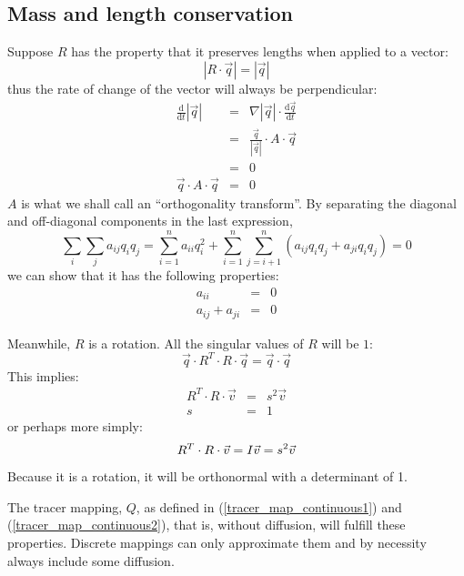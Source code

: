 \documentclass[11pt]{article}
\begin{document}
\subsection{Mass and length conservation}

Suppose $R$ has the property that it preserves lengths when applied to
a vector:
\begin{equation}
|R\cdot \vec q| = |\vec q|
\label{length_preservation}
\end{equation}
thus the rate of change of the vector will always be perpendicular:
\begin{eqnarray}
\frac{\mathrm d}{\mathrm d t}|\vec q| & = & 
	\nabla |\vec q| \cdot \frac{\mathrm d \vec q}{\mathrm d t} \\
	&=& \frac{\vec q}{|\vec q|} \cdot A \cdot \vec q \\
	&=& 0 \\
	\vec q \cdot A \cdot \vec q & = & 0 
\end{eqnarray}
$A$ is what we shall call an ``orthogonality transform''.
By separating the diagonal and off-diagonal components in the last expression,
\begin{equation}
\sum_i \sum_j a_{ij} q_i q_j = \sum_{i=1}^n a_{ii}q_i^2 + \sum_{i=1}^n \sum_{j=i+1}^n (a_{ij} q_i q_j + a_{ji} q_i q_j) = 0
\end{equation}
we can show that it has the following
properties:
\begin{eqnarray}
a_{ii} & = & 0 \\
a_{ij}+a_{ji} & = & 0
\end{eqnarray}

Meanwhile, $R$ is a rotation.  All the singular values of $R$ will be $1$:
\begin{equation}
	\vec q \cdot R^T \cdot R \cdot \vec q = \vec q \cdot \vec q \label{length_conservation}
\end{equation}
This implies:
\begin{eqnarray}
R^T \cdot R \cdot \vec v & = & s^2 \vec v \nonumber \\
	s & = & 1 \label{ortho_eigen}
\end{eqnarray}
or perhaps more simply:
\begin{equation}
	R^T \cdot R \cdot \vec v = I \vec v = s^2 \vec v \\
\end{equation}
Because it is a rotation, it will be orthonormal with a determinant of 1.

The tracer mapping, $Q$, as defined in 
(\ref{tracer_map_continuous1}) and (\ref{tracer_map_continuous2}),
that is, without diffusion, will fulfill these properties.  Discrete mappings
can only approximate them and by necessity always include some diffusion.
\end{document}
